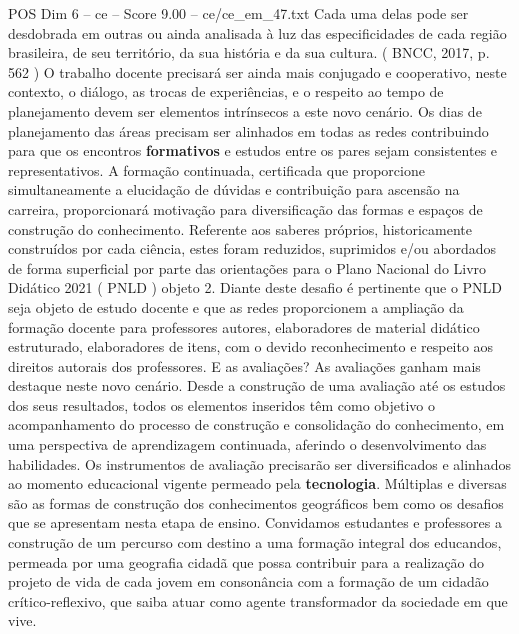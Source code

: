 \begin{textsample}{POS Dim 6 – ce – Score 9.00 – ce/ce\_em\_47.txt}
Cada uma delas pode ser desdobrada em outras ou ainda analisada à luz das especificidades de cada região brasileira, de seu território, da sua história e da sua cultura. ( BNCC, 2017, p. 562 ) O trabalho docente precisará ser ainda mais conjugado e cooperativo, neste contexto, o diálogo, as trocas de experiências, e o respeito ao tempo de planejamento devem ser elementos intrínsecos a este novo cenário.
Os dias de planejamento das áreas precisam ser alinhados em todas as redes contribuindo para que os encontros \textbf{formativos} e estudos entre os pares sejam consistentes e representativos.
A formação continuada, certificada que proporcione simultaneamente a elucidação de dúvidas e contribuição para ascensão na carreira, proporcionará motivação para diversificação das formas e espaços de construção do conhecimento.
Referente aos saberes próprios, historicamente construídos por cada ciência, estes foram reduzidos, suprimidos e/ou abordados de forma superficial por parte das orientações para o Plano Nacional do Livro Didático 2021 ( PNLD ) objeto 2.
Diante deste desafio é pertinente que o PNLD seja objeto de estudo docente e que as redes proporcionem a ampliação da formação docente para professores autores, elaboradores de material didático estruturado, elaboradores de itens, com o devido reconhecimento e respeito aos direitos autorais dos professores.
E as avaliações?
As avaliações ganham mais destaque neste novo cenário.
Desde a construção de uma avaliação até os estudos dos seus resultados, todos os elementos inseridos têm como objetivo o acompanhamento do processo de construção e consolidação do conhecimento, em uma perspectiva de aprendizagem continuada, aferindo o desenvolvimento das habilidades.
Os instrumentos de avaliação precisarão ser diversificados e alinhados ao momento educacional vigente permeado pela \textbf{tecnologia}.
Múltiplas e diversas são as formas de construção dos conhecimentos geográficos bem como os desafios que se apresentam nesta etapa de ensino.
Convidamos estudantes e professores a construção de um percurso com destino a uma formação integral dos educandos, permeada por uma geografia cidadã que possa contribuir para a realização do projeto de vida de cada jovem em consonância com a formação de um cidadão crítico-reflexivo, que saiba atuar como agente transformador da sociedade em que vive.

\end{textsample}
